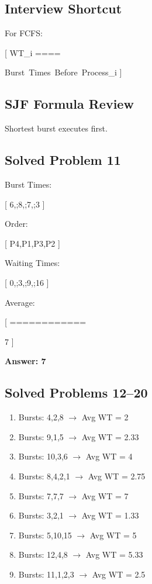 \subsection{Interview Shortcut}

For FCFS:

[
WT_i
====

\sum Burst\ Times\ Before\ Process_i
]

\subsection{SJF Formula Review}

Shortest burst executes first.

\subsection{Solved Problem 11}

Burst Times:

[
6,;8,;7,;3
]

Order:

[
P4,P1,P3,P2
]

Waiting Times:

[
0,;3,;9,;16
]

Average:

[
============

7
]

\textbf{Answer: 7}

\subsection{Solved Problems 12--20}

\begin{enumerate}
\item Bursts: 4,2,8 $\rightarrow$ Avg WT = 2
\item Bursts: 9,1,5 $\rightarrow$ Avg WT = 2.33
\item Bursts: 10,3,6 $\rightarrow$ Avg WT = 4
\item Bursts: 8,4,2,1 $\rightarrow$ Avg WT = 2.75
\item Bursts: 7,7,7 $\rightarrow$ Avg WT = 7
\item Bursts: 3,2,1 $\rightarrow$ Avg WT = 1.33
\item Bursts: 5,10,15 $\rightarrow$ Avg WT = 5
\item Bursts: 12,4,8 $\rightarrow$ Avg WT = 5.33
\item Bursts: 11,1,2,3 $\rightarrow$ Avg WT = 2.5
\end{enumerate}

